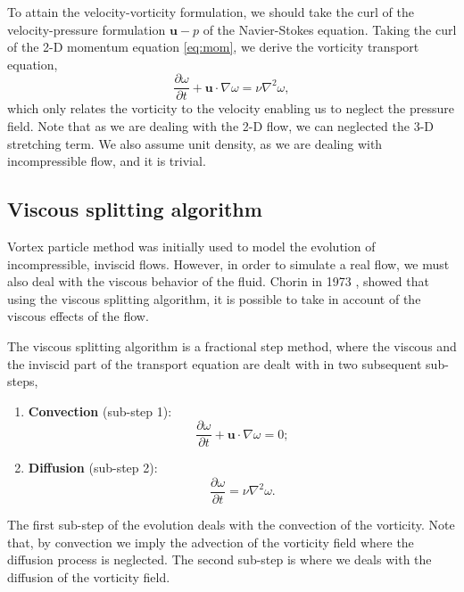 To attain the velocity-vorticity formulation, we should take the curl of the velocity-pressure formulation $\mathbf{u}-p$ of the Navier-Stokes equation. Taking the curl of the 2-D momentum equation \ref{eq:mom}, we derive the vorticity transport equation,
	\begin{equation}
	\frac{\partial \omega}{\partial t} + \mathbf{u}\cdot\nabla\omega = \nu \nabla^2 \omega,
	\end{equation}
which only relates the vorticity to the velocity enabling us to neglect the pressure field. Note that as we are dealing with the 2-D flow, we can neglected the 3-D stretching term. We also assume unit density, as we are dealing with incompressible flow, and it is trivial.

\subsection{Viscous splitting algorithm}
Vortex particle method was initially used to model the evolution of incompressible, inviscid flows. However, in order to simulate a real flow, we must also deal with the viscous behavior of the fluid. Chorin in 1973 \cite{Chorin1973a}, showed that using the viscous splitting algorithm, it is possible to take in account of the viscous effects of the flow. 

The viscous splitting algorithm is a fractional step method, where the viscous and the inviscid part of the transport equation are dealt with in two subsequent sub-steps, 

	\begin{enumerate}
	\item \textbf{Convection} (sub-step 1):
		\begin{equation}
		\frac{\partial\omega}{\partial t} + \mathbf{u}\cdot\nabla\omega=0;
		\label{eq:convectionEulerian}
		\end{equation}
		
	\item \textbf{Diffusion} (sub-step 2):
		\begin{equation}
		\frac{\partial\omega}{\partial t} = \nu\nabla^2\omega.
		\label{eq:vsa2}
		\end{equation}
	\end{enumerate}

The first sub-step of the evolution deals with the convection of the vorticity. Note that, by convection we imply the advection of the vorticity field where the diffusion process is neglected. The second sub-step is where we deals with the diffusion of the vorticity field. 

